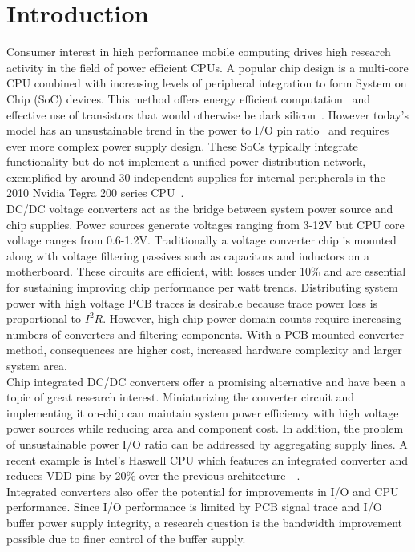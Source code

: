 \documentclass[letterpaper,twocolumn,10pt]{article}
\begin{document}
\section{Introduction}

Consumer interest in high performance mobile computing drives high research activity in the field of power efficient CPUs. A popular chip design is a multi-core CPU combined with increasing levels of peripheral integration to form System on Chip (SoC) devices. This method offers energy efficient computation~\cite{Chandrakasan1992} and effective use of transistors that would otherwise be dark silicon~\cite{Taylor2012}. However today's model has an unsustainable trend in the power to I/O pin ratio~\cite{Marbell2011} and requires ever more complex power supply design. These SoCs typically integrate functionality but do not implement a unified power distribution network, exemplified by around 30 independent supplies for internal peripherals in the 2010 Nvidia Tegra 200 series CPU~\cite{NVidia2010}.\\
DC/DC voltage converters act as the bridge between system power source and chip supplies. Power sources generate voltages ranging from 3-12V but CPU core voltage ranges from 0.6-1.2V. Traditionally a voltage converter chip is mounted along with voltage filtering passives such as capacitors and inductors on a motherboard. These circuits are efficient, with losses under 10\% and are essential for sustaining improving chip performance per watt trends. Distributing system power with high voltage PCB traces is desirable because trace power loss is proportional to $I^2R$. However, high chip power domain counts require increasing numbers of converters and filtering components. With a PCB mounted converter method, consequences are higher cost, increased hardware complexity and larger system area.\\
Chip integrated DC/DC converters offer a promising alternative and have been a topic of great research interest. Miniaturizing the converter circuit and implementing it on-chip can maintain system power efficiency with high voltage power sources while reducing area and component cost. In addition, the problem of unsustainable power I/O ratio can be addressed by aggregating supply lines. A recent example is Intel's Haswell CPU which features an integrated converter and reduces VDD pins by 20\% over the previous architecture~\cite{IntelHaswell2014}~\cite{IntelIvyBridge2013}.\\
Integrated converters also offer the potential for improvements in I/O and CPU performance. Since I/O performance is limited by PCB signal trace and I/O buffer power supply integrity, a research question is the bandwidth improvement possible due to finer control of the buffer supply.
\end{document}
